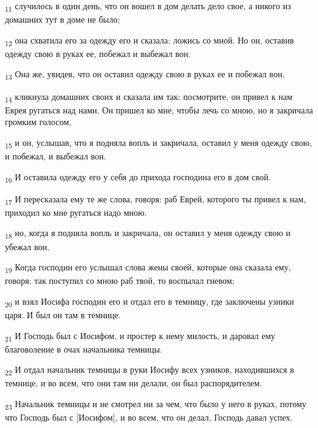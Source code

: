\begin{tcolorbox}
\textsubscript{11} случилось в один день, что он вошел в дом делать дело свое, а никого из домашних тут в доме не было;
\end{tcolorbox}
\begin{tcolorbox}
\textsubscript{12} она схватила его за одежду его и сказала: ложись со мной. Но он, оставив одежду свою в руках ее, побежал и выбежал вон.
\end{tcolorbox}
\begin{tcolorbox}
\textsubscript{13} Она же, увидев, что он оставил одежду свою в руках ее и побежал вон,
\end{tcolorbox}
\begin{tcolorbox}
\textsubscript{14} кликнула домашних своих и сказала им так: посмотрите, он привел к нам Еврея ругаться над нами. Он пришел ко мне, чтобы лечь со мною, но я закричала громким голосом,
\end{tcolorbox}
\begin{tcolorbox}
\textsubscript{15} и он, услышав, что я подняла вопль и закричала, оставил у меня одежду свою, и побежал, и выбежал вон.
\end{tcolorbox}
\begin{tcolorbox}
\textsubscript{16} И оставила одежду его у себя до прихода господина его в дом свой.
\end{tcolorbox}
\begin{tcolorbox}
\textsubscript{17} И пересказала ему те же слова, говоря: раб Еврей, которого ты привел к нам, приходил ко мне ругаться надо мною.
\end{tcolorbox}
\begin{tcolorbox}
\textsubscript{18} но, когда я подняла вопль и закричала, он оставил у меня одежду свою и убежал вон.
\end{tcolorbox}
\begin{tcolorbox}
\textsubscript{19} Когда господин его услышал слова жены своей, которые она сказала ему, говоря: так поступил со мною раб твой, то воспылал гневом;
\end{tcolorbox}
\begin{tcolorbox}
\textsubscript{20} и взял Иосифа господин его и отдал его в темницу, где заключены узники царя. И был он там в темнице.
\end{tcolorbox}
\begin{tcolorbox}
\textsubscript{21} И Господь был с Иосифом, и простер к нему милость, и даровал ему благоволение в очах начальника темницы.
\end{tcolorbox}
\begin{tcolorbox}
\textsubscript{22} И отдал начальник темницы в руки Иосифу всех узников, находившихся в темнице, и во всем, что они там ни делали, он был распорядителем.
\end{tcolorbox}
\begin{tcolorbox}
\textsubscript{23} Начальник темницы и не смотрел ни за чем, что было у него в руках, потому что Господь был с [Иосифом], и во всем, что он делал, Господь давал успех.
\end{tcolorbox}
